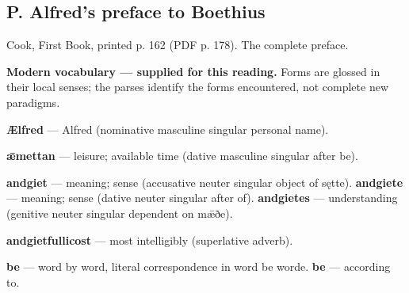 \subsection*{P. Alfred’s preface to Boethius}

Cook, First Book, printed p. 162 (PDF p. 178). The complete preface.

\textbf{Modern vocabulary — supplied for this reading.} Forms are glossed in their local senses; the parses identify the forms encountered, not complete new paradigms.

\textbf{Ælfred} — Alfred (nominative masculine singular personal name).

\textbf{ǣmettan} — leisure; available time (dative masculine singular after be).

\textbf{andgiet} — meaning; sense (accusative neuter singular object of sętte). \textbf{andgiete} — meaning; sense (dative neuter singular after of). \textbf{andgietes} — understanding (genitive neuter singular dependent on mǣðe).

\textbf{andgietfullicost} — most intelligibly (superlative adverb).

\textbf{be} — word by word, literal correspondence in word be worde. \textbf{be} — according to.

